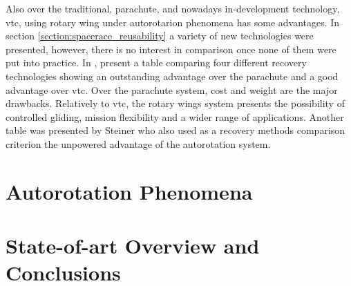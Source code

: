 Also over the traditional, parachute, and nowadays in-development technology, \gls{vtc}, using rotary wing under autorotarion phenomena has some advantages. In section \ref{section:spacerace_reusability} a variety of new technologies were presented, however, there is no interest in comparison once none of them were put into practice. In \cite{marques_rocket_2022}, present a table comparing four different recovery technologies showing an outstanding advantage over the parachute and a good advantage over \gls{vtc}. Over the parachute system, cost and weight are the major drawbacks. Relatively to \gls{vtc}, the rotary wings system presents the possibility of controlled gliding, mission flexibility and a wider range of applications. Another table was presented by Steiner \cite{steiner_rotary_nodate} who also used as a recovery methods comparison criterion the unpowered advantage of the autorotation system. 

\section{Autorotation Phenomena}
\label{section:autorotation_phenomena}



\section{State-of-art Overview and Conclusions}
\label{section:state_of_art_conclusions}

